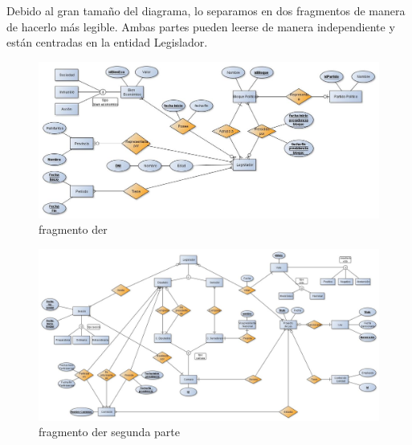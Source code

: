 Debido al gran tama\~no del diagrama, lo separamos en dos fragmentos de manera de hacerlo m\'as legible. Ambas partes pueden leerse de manera independiente y est\'an centradas en la entidad Legislador.
			
		\begin{figure}[H]
		  \begin{center}
		    \includegraphics[scale=.40,angle=90]{./imagenes/DER2-arriba.jpg}
		    \caption{fragmento der} 
		    \label{fig:derparte1}
		  \end{center}
		\end{figure}
				
		\begin{figure}[H]
		  \begin{center}
		    \includegraphics[scale=.35,angle=90]{./imagenes/DER2-abajo.jpg}
		    \caption{fragmento der segunda parte} 
		    \label{fig:derparte2}
		  \end{center}
		\end{figure}